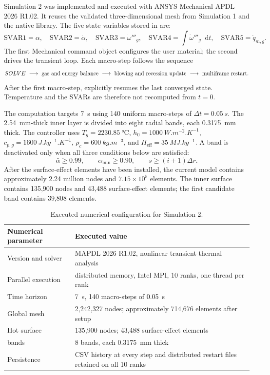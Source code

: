 \documentclass[oneside,openany]{amsdtx}
\newcommand{\dd}{\mathop{}\!\mathrm{d}}
\begin{document}
Simulation 2 was implemented and executed with ANSYS Mechanical APDL 2026
R1.02. It reuses the validated three-dimensional mesh from Simulation 1 and the
native  library. The five state variables stored in
 are:
\begin{equation}
  \mathrm{SVAR1}=\alpha,\quad
  \mathrm{SVAR2}=\dot\alpha,\quad
  \mathrm{SVAR3}=\dot\omega'''_g,\quad
  \mathrm{SVAR4}=\int\dot\omega'''_g\dd t,\quad
  \mathrm{SVAR5}=\dot q_{m,g}.
\end{equation}
The first Mechanical command object configures the user material; the second
drives the transient loop. Each macro-step follows the sequence
\[
  SOLVE\ \longrightarrow\ \text{gas and energy balance}\
  \longrightarrow\ \text{blowing and recession update}\
  \longrightarrow\ \text{multiframe restart}.
\]
After the first macro-step,  explicitly resumes
the last converged state. Temperature and the SVARs are therefore not
recomputed from \(t=0\).

The computation targets \SI{7}{s} using 140 uniform macro-steps of
\(\Delta t=\SI{0.05}{s}\). The \SI{2.54}{mm}-thick inner  layer is
divided into eight radial bands, each \SI{0.3175}{mm} thick. The controller uses
\(T_g=\SI{2230.85}{\celsius}\),
\(h_0=\SI{1000}{W.m^{-2}.K^{-1}}\),
\(c_{p,g}=\SI{1600}{J.kg^{-1}.K^{-1}}\),
\(\rho_c=\SI{600}{kg.m^{-3}}\), and
\(H_\mathrm{eff}=\SI{35}{MJ.kg^{-1}}\). A band is deactivated only when all
three conditions below are satisfied:
\[
  \bar\alpha\ge0.99,\qquad
  \alpha_\mathrm{min}\ge0.90,\qquad
  s\ge(i+1)\Delta r.
\]
After the surface-effect elements have been installed, the current model
contains approximately 2.24 million nodes and
\(7.15\times10^5\) elements. The inner surface contains 135,900 nodes and
43,488 surface-effect elements; the first candidate band contains 39,808
elements.

\begin{table}[H]
\centering
\small
\renewcommand{\arraystretch}{1.15}
\begin{tabular}{L{0.38\textwidth}L{0.50\textwidth}}
\toprule
\textbf{Numerical parameter} & \textbf{Executed value} \\
\midrule
Version and solver & MAPDL 2026 R1.02, nonlinear transient thermal analysis \\
Parallel execution & distributed memory, Intel MPI, 10 ranks, one thread per rank \\
Time horizon & \SI{7}{s}, 140 macro-steps of \SI{0.05}{s} \\
Global mesh & 2,242,327 nodes; approximately 714,676 elements after setup \\
Hot surface & 135,900 nodes; 43,488 surface-effect elements \\
\code{phe0} bands & 8 bands, each \SI{0.3175}{mm} thick \\
Persistence & CSV history at every step and distributed restart files retained on all 10 ranks \\
\bottomrule
\end{tabular}
\caption{Executed numerical configuration for Simulation 2.}
\label{tab:sim2-implementation}
\end{table}
\end{document}
